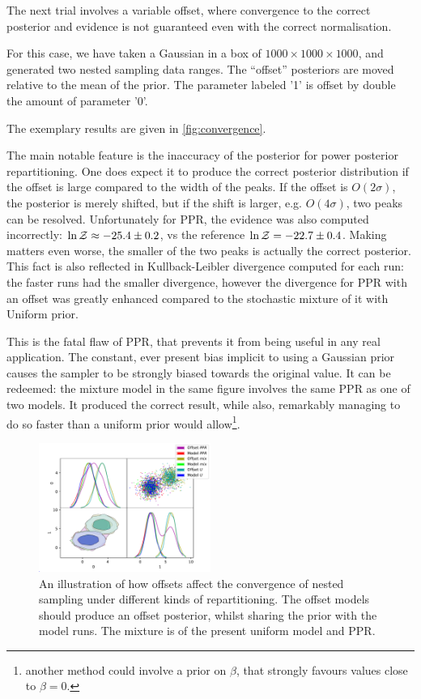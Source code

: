 \documentclass[usenatbib]{mnras}
\begin{document}
The next trial involves a variable offset, where convergence to the
correct posterior and evidence is not guaranteed even with the
correct normalisation.    

For this case, we have taken a Gaussian in a box of
\(1000\times1000\times1000\), and generated two nested sampling data
ranges. The ``offset'' posteriors are moved relative to the mean of
the prior. The parameter labeled '1' is offset by double the amount
of parameter '0'. 

The exemplary results are given in \autoref{fig:convergence}.

The main notable feature is the inaccuracy of the posterior for
power posterior repartitioning. One does expect it to produce the
correct posterior distribution if the offset is large compared to
the width of the peaks. If the offset is \(O(2\sigma)\), the
posterior is merely shifted, but if the shift is larger,
e.g. \(O(4\sigma)\), two peaks can be resolved. Unfortunately for
PPR, the evidence was also computed incorrectly: \(\ln {\cal
  Z}\approx -25.4 \pm 0.2\), vs the reference \(\ln {\cal Z} = -22.7 \pm
  0.4\).  Making matters even worse, the smaller of the two peaks is
actually the correct posterior. This fact is also reflected in
Kullback-Leibler divergence computed for each run: the faster runs
had the smaller divergence, however the divergence for PPR with an
offset was greatly enhanced compared to the stochastic mixture of it
with Uniform prior. 

This is the fatal flaw of PPR, that prevents it from being useful in
any real application. The constant, ever present bias implicit to
using a Gaussian prior causes the sampler to be strongly biased
towards the original value. It can be redeemed: the mixture model in
the same figure involves the same PPR as one of two models. It
produced the correct result, while also, remarkably managing to do
so faster than a uniform prior would allow\footnote{another method could
involve a prior on \(\beta\), that strongly favours values close to
\(\beta=0\).}.

\begin{figure}
\includegraphics[width=0.5\textwidth]{./illustrations/convergence.pdf}
\caption{\label{org7bdd459}
An illustration of how offsets affect the convergence of nested sampling under different kinds of repartitioning. The offset models should produce an offset posterior, whilst sharing the prior with the model runs. The mixture is of the present uniform model and PPR.}
\end{figure}
\end{document}
